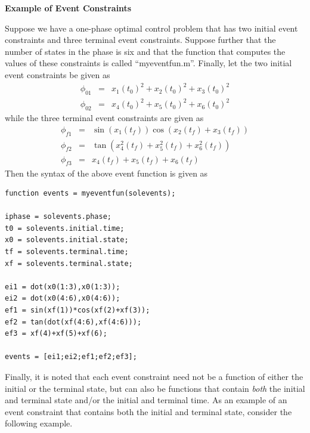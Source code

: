 \documentclass[10pt,final]{report}
\newcounter{example}[chapter]
\newenvironment{shadedframe}{%
  \def\FrameCommand{\fcolorbox{black}{shadecolor}}%
  \MakeFramed {\FrameRestore}}
{\endMakeFramed}
\begin{document}
\begin{shadedframe}
{\noindent}{\bf Example of Event Constraints}
\vspace{12pt}

{\noindent}Suppose we have a one-phase optimal control problem that has two
initial event constraints and three terminal event constraints.  Suppose
further that the number of states in the phase is six and that the function
that computes the values of these constraints is called ``myeventfun.m''.
Finally, let the two initial event constraints be given as
\begin{displaymath}
  \begin{array}{lcl}
    \phi_{01} & = & x_1(t_0)^2+x_2(t_0)^2+x_3(t_0)^2 \\
    \phi_{02} & = & x_4(t_0)^2+x_5(t_0)^2+x_6(t_0)^2
  \end{array}
\end{displaymath}
while the three terminal event constraints are given as
\begin{displaymath}
  \begin{array}{lcl}
    \phi_{f1} & = & \sin(x_1(t_f))\cos(x_2(t_f)+x_3(t_f)) \\
    \phi_{f2} & = & \tan(x_4^2(t_f)+x_5^2(t_f)+x_6^2(t_f)) \\
    \phi_{f3} & = & x_4(t_f)+x_5(t_f)+x_6(t_f)
  \end{array}
\end{displaymath}
Then the syntax of the above event function is given as
\begin{verbatim}
function events = myeventfun(solevents);

iphase = solevents.phase;
t0 = solevents.initial.time;
x0 = solevents.initial.state;
tf = solevents.terminal.time;
xf = solevents.terminal.state;

ei1 = dot(x0(1:3),x0(1:3));
ei2 = dot(x0(4:6),x0(4:6));
ef1 = sin(xf(1))*cos(xf(2)+xf(3));
ef2 = tan(dot(xf(4:6),xf(4:6)));
ef3 = xf(4)+xf(5)+xf(6);

events = [ei1;ei2;ef1;ef2;ef3];
\end{verbatim}

\end{shadedframe}

Finally, it is noted that each event constraint need not be a function of
either the initial or the terminal state, but can also be functions that
contain {\em both} the initial and terminal state and/or the initial and
terminal time.  As an example of an event constraint that contains both the
initial and terminal state, consider the following example.
\end{document}
